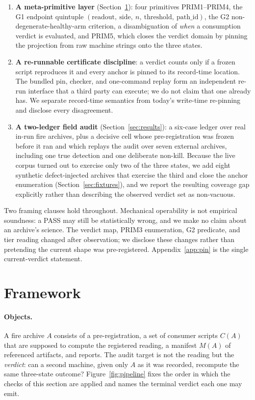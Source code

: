 \documentclass{article}
\begin{document}
\begin{enumerate}
\item \textbf{A meta-primitive layer} (Section~\ref{sec:framework}): four primitives
PRIM1--PRIM4, the G1 endpoint quintuple
$(\text{readout},\ \text{side},\ n,\ \text{threshold},\ \text{path\_id})$, the G2
non-degenerate-healthy-arm criterion, a disambiguation of \emph{when} a consumption
verdict is evaluated, and PRIM5, which closes the verdict domain by pinning the projection
from raw machine strings onto the three states.
\item \textbf{A re-runnable certificate discipline}: a verdict counts only if a frozen
script reproduces it and every anchor is pinned to its record-time location. The bundled
pin, checker, and one-command replay form an independent re-run interface that a third
party can execute; we do not claim that one already has. We separate record-time semantics
from today's write-time re-pinning and disclose every disagreement.
\item \textbf{A two-ledger field audit} (Section~\ref{sec:results}): a six-case ledger
over real in-run fire archives, plus a decisive cell whose pre-registration was frozen
before it ran and which replays the audit over seven external archives, including one
true detection and one deliberate non-kill. Because the live corpus turned out to exercise
only two of the three states, we add eight synthetic defect-injected archives that exercise
the third and close the anchor enumeration (Section~\ref{sec:fixtures}), and we report the
resulting coverage gap explicitly rather than describing the observed verdict set as
non-vacuous.
\end{enumerate}

Two framing clauses hold throughout. Mechanical operability is not empirical soundness: a
PASS may still be statistically wrong, and we make no claim about an archive's science.
The verdict map, PRIM3 enumeration, G2 predicate, and tier reading changed after
observation; we disclose these changes rather than pretending the current shape was
pre-registered. Appendix~\ref{app:pin} is the single current-verdict statement.

\section{Framework}
\label{sec:framework}

\paragraph{Objects.}
A fire archive $A$ consists of a pre-registration, a set of consumer scripts $C(A)$ that
are supposed to compute the registered reading, a manifest $M(A)$ of referenced
artifacts, and reports. The audit target is not the reading but the \emph{verdict}: can a
second machine, given only $A$ as it was recorded, recompute the same three-state
outcome? Figure~\ref{fig:pipeline} fixes the order in which the checks of this section are
applied and names the terminal verdict each one may emit.
\end{document}
